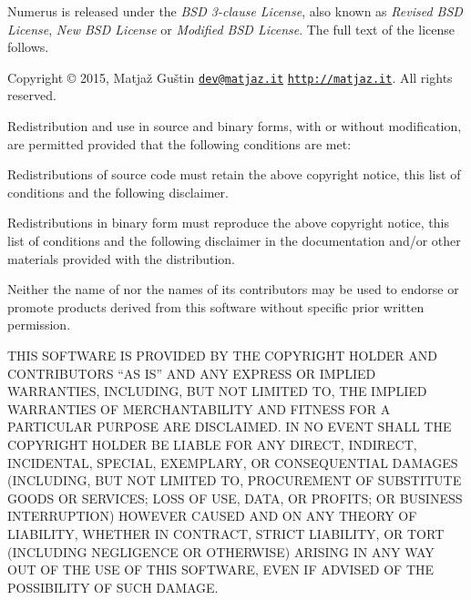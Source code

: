 Numerus is released under the {\itshape B\+S\+D 3-\/clause License}, also known as {\itshape Revised B\+S\+D License}, {\itshape New B\+S\+D License} or {\itshape Modified B\+S\+D License}. The full text of the license follows.





Copyright © 2015, Matjaž Guštin \href{mailto:dev@matjaz.it}{\tt dev@matjaz.\+it} \href{http://matjaz.it}{\tt http\+://matjaz.\+it}. All rights reserved.

Redistribution and use in source and binary forms, with or without modification, are permitted provided that the following conditions are met\+:


\begin{DoxyEnumerate}
\item Redistributions of source code must retain the above copyright notice, this list of conditions and the following disclaimer.
\item Redistributions in binary form must reproduce the above copyright notice, this list of conditions and the following disclaimer in the documentation and/or other materials provided with the distribution.
\item Neither the name of nor the names of its contributors may be used to endorse or promote products derived from this software without specific prior written permission.
\end{DoxyEnumerate}

T\+H\+I\+S S\+O\+F\+T\+W\+A\+R\+E I\+S P\+R\+O\+V\+I\+D\+E\+D B\+Y T\+H\+E C\+O\+P\+Y\+R\+I\+G\+H\+T H\+O\+L\+D\+E\+R A\+N\+D C\+O\+N\+T\+R\+I\+B\+U\+T\+O\+R\+S “\+A\+S I\+S” A\+N\+D A\+N\+Y E\+X\+P\+R\+E\+S\+S O\+R I\+M\+P\+L\+I\+E\+D W\+A\+R\+R\+A\+N\+T\+I\+E\+S, I\+N\+C\+L\+U\+D\+I\+N\+G, B\+U\+T N\+O\+T L\+I\+M\+I\+T\+E\+D T\+O, T\+H\+E I\+M\+P\+L\+I\+E\+D W\+A\+R\+R\+A\+N\+T\+I\+E\+S O\+F M\+E\+R\+C\+H\+A\+N\+T\+A\+B\+I\+L\+I\+T\+Y A\+N\+D F\+I\+T\+N\+E\+S\+S F\+O\+R A P\+A\+R\+T\+I\+C\+U\+L\+A\+R P\+U\+R\+P\+O\+S\+E A\+R\+E D\+I\+S\+C\+L\+A\+I\+M\+E\+D. I\+N N\+O E\+V\+E\+N\+T S\+H\+A\+L\+L T\+H\+E C\+O\+P\+Y\+R\+I\+G\+H\+T H\+O\+L\+D\+E\+R B\+E L\+I\+A\+B\+L\+E F\+O\+R A\+N\+Y D\+I\+R\+E\+C\+T, I\+N\+D\+I\+R\+E\+C\+T, I\+N\+C\+I\+D\+E\+N\+T\+A\+L, S\+P\+E\+C\+I\+A\+L, E\+X\+E\+M\+P\+L\+A\+R\+Y, O\+R C\+O\+N\+S\+E\+Q\+U\+E\+N\+T\+I\+A\+L D\+A\+M\+A\+G\+E\+S (I\+N\+C\+L\+U\+D\+I\+N\+G, B\+U\+T N\+O\+T L\+I\+M\+I\+T\+E\+D T\+O, P\+R\+O\+C\+U\+R\+E\+M\+E\+N\+T O\+F S\+U\+B\+S\+T\+I\+T\+U\+T\+E G\+O\+O\+D\+S O\+R S\+E\+R\+V\+I\+C\+E\+S; L\+O\+S\+S O\+F U\+S\+E, D\+A\+T\+A, O\+R P\+R\+O\+F\+I\+T\+S; O\+R B\+U\+S\+I\+N\+E\+S\+S I\+N\+T\+E\+R\+R\+U\+P\+T\+I\+O\+N) H\+O\+W\+E\+V\+E\+R C\+A\+U\+S\+E\+D A\+N\+D O\+N A\+N\+Y T\+H\+E\+O\+R\+Y O\+F L\+I\+A\+B\+I\+L\+I\+T\+Y, W\+H\+E\+T\+H\+E\+R I\+N C\+O\+N\+T\+R\+A\+C\+T, S\+T\+R\+I\+C\+T L\+I\+A\+B\+I\+L\+I\+T\+Y, O\+R T\+O\+R\+T (I\+N\+C\+L\+U\+D\+I\+N\+G N\+E\+G\+L\+I\+G\+E\+N\+C\+E O\+R O\+T\+H\+E\+R\+W\+I\+S\+E) A\+R\+I\+S\+I\+N\+G I\+N A\+N\+Y W\+A\+Y O\+U\+T O\+F T\+H\+E U\+S\+E O\+F T\+H\+I\+S S\+O\+F\+T\+W\+A\+R\+E, E\+V\+E\+N I\+F A\+D\+V\+I\+S\+E\+D O\+F T\+H\+E P\+O\+S\+S\+I\+B\+I\+L\+I\+T\+Y O\+F S\+U\+C\+H D\+A\+M\+A\+G\+E. 